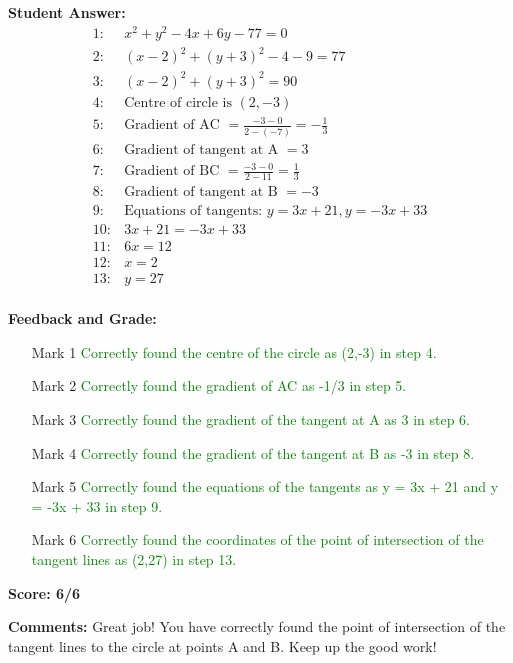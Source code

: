 \documentclass{article}
\begin{document}
\textbf{Student Answer:}
\begin{align*}
1: & x^2+y^2-4x+6y-77=0 \\
2: & (x-2)^2+(y+3)^2-4-9=77 \\
3: & (x-2)^2+(y+3)^2=90 \\
4: & \text{Centre of circle is }(2,-3) \\
5: & \text{Gradient of AC } = \frac{-3-0}{2-(-7)} = -\frac{1}{3} \\
6: & \text{Gradient of tangent at A } = 3 \\
7: & \text{Gradient of BC } = \frac{-3-0}{2-11} = \frac{1}{3} \\
8: & \text{Gradient of tangent at B } = -3 \\
9: & \text{Equations of tangents: } y = 3x + 21, y = -3x + 33 \\
10: & 3x + 21 = -3x + 33 \\
11: & 6x = 12 \\
12: & x = 2 \\
13: & y = 27 \\
\end{align*}

\textbf{Feedback and Grade:}
\begin{itemize}
\item[Mark 1] \textcolor{green}{Correctly found the centre of the circle as (2,-3) in step 4.}
\item[Mark 2] \textcolor{green}{Correctly found the gradient of AC as -1/3 in step 5.}
\item[Mark 3] \textcolor{green}{Correctly found the gradient of the tangent at A as 3 in step 6.}
\item[Mark 4] \textcolor{green}{Correctly found the gradient of the tangent at B as -3 in step 8.}
\item[Mark 5] \textcolor{green}{Correctly found the equations of the tangents as y = 3x + 21 and y = -3x + 33 in step 9.}
\item[Mark 6] \textcolor{green}{Correctly found the coordinates of the point of intersection of the tangent lines as (2,27) in step 13.}
\end{itemize}

\textbf{Score: 6/6}

\textbf{Comments:} Great job! You have correctly found the point of intersection of the tangent lines to the circle at points A and B. Keep up the good work!
\end{document}

